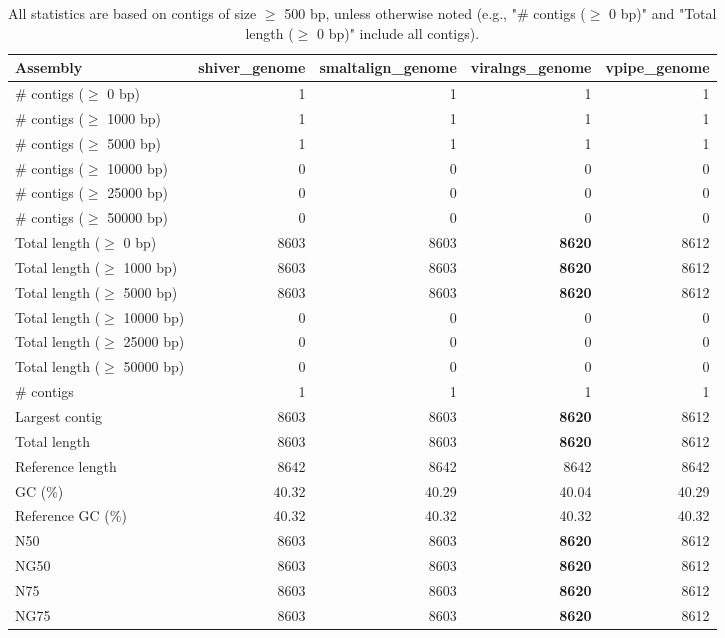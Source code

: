\documentclass[12pt,a4paper]{article}
\begin{document}
\begin{table}[ht]
\begin{center}
\caption{All statistics are based on contigs of size $\geq$ 500 bp, unless otherwise noted (e.g., "\# contigs ($\geq$ 0 bp)" and "Total length ($\geq$ 0 bp)" include all contigs).}
\begin{tabular}{|l*{4}{|r}|}
\hline
Assembly & shiver\_genome & smaltalign\_genome & viralngs\_genome & vpipe\_genome \\ \hline
\# contigs ($\geq$ 0 bp) & 1 & 1 & 1 & 1 \\ \hline
\# contigs ($\geq$ 1000 bp) & 1 & 1 & 1 & 1 \\ \hline
\# contigs ($\geq$ 5000 bp) & 1 & 1 & 1 & 1 \\ \hline
\# contigs ($\geq$ 10000 bp) & 0 & 0 & 0 & 0 \\ \hline
\# contigs ($\geq$ 25000 bp) & 0 & 0 & 0 & 0 \\ \hline
\# contigs ($\geq$ 50000 bp) & 0 & 0 & 0 & 0 \\ \hline
Total length ($\geq$ 0 bp) & 8603 & 8603 & {\bf 8620} & 8612 \\ \hline
Total length ($\geq$ 1000 bp) & 8603 & 8603 & {\bf 8620} & 8612 \\ \hline
Total length ($\geq$ 5000 bp) & 8603 & 8603 & {\bf 8620} & 8612 \\ \hline
Total length ($\geq$ 10000 bp) & 0 & 0 & 0 & 0 \\ \hline
Total length ($\geq$ 25000 bp) & 0 & 0 & 0 & 0 \\ \hline
Total length ($\geq$ 50000 bp) & 0 & 0 & 0 & 0 \\ \hline
\# contigs & 1 & 1 & 1 & 1 \\ \hline
Largest contig & 8603 & 8603 & {\bf 8620} & 8612 \\ \hline
Total length & 8603 & 8603 & {\bf 8620} & 8612 \\ \hline
Reference length & 8642 & 8642 & 8642 & 8642 \\ \hline
GC (\%) & 40.32 & 40.29 & 40.04 & 40.29 \\ \hline
Reference GC (\%) & 40.32 & 40.32 & 40.32 & 40.32 \\ \hline
N50 & 8603 & 8603 & {\bf 8620} & 8612 \\ \hline
NG50 & 8603 & 8603 & {\bf 8620} & 8612 \\ \hline
N75 & 8603 & 8603 & {\bf 8620} & 8612 \\ \hline
NG75 & 8603 & 8603 & {\bf 8620} & 8612 \\ \hline

\end{tabular}
\end{center}
\end{table}
\end{document}
